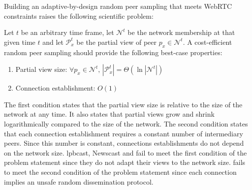 Building an adaptive-by-design random peer sampling that meets WebRTC
constraints raises the following scientific problem:
\begin{problem}
  Let $t$ be an arbitrary time frame, let $\mathcal{N}^t$ be the network
  membership at that given time $t$ and let $\mathcal{P}_x^t$ be the partial
  view of peer $p_x \in \mathcal{N}^t$.  A cost-efficient random peer sampling
  should provide the following best-case properties:
  \begin{enumerate}
  \item Partial view size: \hfill
    $\forall p_x \in \mathcal{N}^t,\, |\mathcal{P}_x^t| = \Theta (\ln
    |\mathcal{N}^t|)$      
  \item Connection establishment: \hfill $O(1)$
  \end{enumerate}
\end{problem}

The first condition states that the partial view size is relative to the size
of the network at any time. It also states that partial views grow and shrink
logarithmically compared to the size of the network. The second condition
states that each connection establishment requires a constant number of
intermediary peers. Since this number is constant, connections establishments
do not depend on the network size.
lpbcast, Newscast and \CYCLON fail to meet the first condition of the problem
statement since they do not adapt their views to the network size. \SCAMP fails
to meet the second condition of the problem statement since each connection
implies an unsafe random dissemination protocol.


